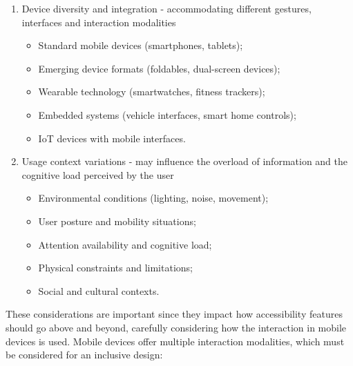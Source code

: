 \begin{enumerate}
    \item Device diversity and integration - accommodating different gestures, interfaces and interaction modalities
        \begin{itemize}
            \item Standard mobile devices (smartphones, tablets);
            \item Emerging device formats (foldables, dual-screen devices);
            \item Wearable technology (smartwatches, fitness trackers);
            \item Embedded systems (vehicle interfaces, smart home controls);
            \item IoT devices with mobile interfaces.
        \end{itemize}
    \item Usage context variations - may influence the overload of information and the cognitive load perceived by the user
        \begin{itemize}
            \item Environmental conditions (lighting, noise, movement);
            \item User posture and mobility situations;
            \item Attention availability and cognitive load;
            \item Physical constraints and limitations;
            \item Social and cultural contexts.
        \end{itemize}
\end{enumerate}

These considerations are important since they impact how accessibility features should go above and beyond, carefully considering how the interaction in mobile devices is used. Mobile devices offer multiple interaction modalities, which must be considered for an inclusive design:

